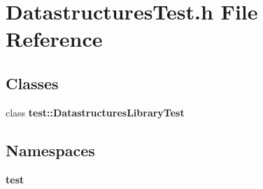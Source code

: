 \section{Datastructures\+Test.\+h File Reference}
\label{DatastructuresTest_8h}
\subsection*{Classes}
\begin{DoxyCompactItemize}
\item 
class {\bf test\+::\+Datastructures\+Library\+Test}
\end{DoxyCompactItemize}
\subsection*{Namespaces}
\begin{DoxyCompactItemize}
\item 
 {\bf test}
\end{DoxyCompactItemize}
